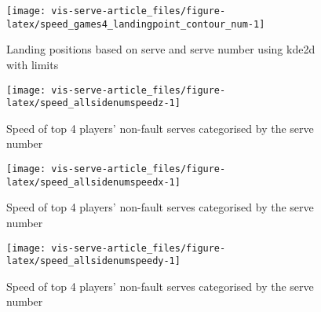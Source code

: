 \documentclass[article]{jss}
\begin{document}
\begin{CodeChunk}
\begin{figure}

{\centering \texttt{[image: vis-serve-article\_files/figure-latex/speed\_games4\_landingpoint\_contour\_num-1]} 

}

\caption[Landing positions based on serve and serve number using kde2d with limits]{Landing positions based on serve and serve number using kde2d with limits}\label{fig:speed_games4_landingpoint_contour_num}
\end{figure}
\end{CodeChunk}

\begin{CodeChunk}
\begin{figure}

{\centering \texttt{[image: vis-serve-article\_files/figure-latex/speed\_allsidenumspeedz-1]} 

}

\caption[Speed of top 4 players' non-fault serves categorised by the serve number]{Speed of top 4 players' non-fault serves categorised by the serve number}\label{fig:speed_allsidenumspeedz}
\end{figure}
\end{CodeChunk}

\begin{CodeChunk}
\begin{figure}

{\centering \texttt{[image: vis-serve-article\_files/figure-latex/speed\_allsidenumspeedx-1]} 

}

\caption[Speed of top 4 players' non-fault serves categorised by the serve number]{Speed of top 4 players' non-fault serves categorised by the serve number}\label{fig:speed_allsidenumspeedx}
\end{figure}
\end{CodeChunk}

\begin{CodeChunk}
\begin{figure}

{\centering \texttt{[image: vis-serve-article\_files/figure-latex/speed\_allsidenumspeedy-1]} 

}

\caption[Speed of top 4 players' non-fault serves categorised by the serve number]{Speed of top 4 players' non-fault serves categorised by the serve number}\label{fig:speed_allsidenumspeedy}
\end{figure}
\end{CodeChunk}
\end{document}
